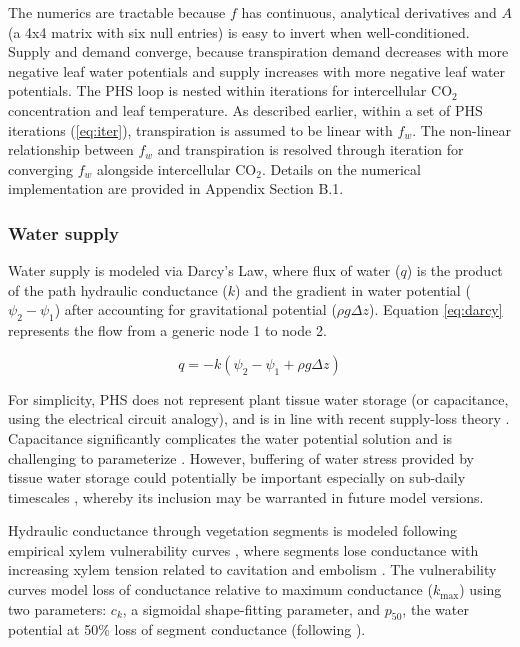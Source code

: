 \documentclass[draft,linenumbers]{agujournal}
\begin{document}
    The numerics are tractable because $f$ has continuous, analytical derivatives and $A$ (a 4x4 matrix with six null entries) is easy to invert when well-conditioned. Supply and demand converge, because transpiration demand decreases with more negative leaf water potentials and supply increases with more negative leaf water potentials. The PHS loop is nested within iterations for intercellular CO$_2$ concentration and leaf temperature. As described earlier, within a set of PHS iterations (\ref{eq:iter}), transpiration is assumed to be linear with $f_w$. The non-linear relationship between $f_w$ and transpiration is resolved through iteration for converging $f_w$ alongside intercellular CO$_2$. Details on the numerical implementation are provided in Appendix Section B.1.
   
    \subsubsection{Water supply}
    \label{sect:supply}
    Water supply is modeled via Darcy's Law, where flux of water ($q$) is the product of the path hydraulic conductance ($k$) and the gradient in water potential ($\psi_2-\psi_1$) after accounting for gravitational potential ($\rho g \Delta z$).  
    Equation \ref{eq:darcy} represents the flow from a generic node 1 to node 2. 
    
     \begin{linenomath*}
     \begin{equation}
     \label{eq:darcy}
     q = -k\left(\psi_2 - \psi_1 + \rho g \Delta z\right)
     \end{equation}
     \end{linenomath*}
    
    For simplicity, PHS does not represent plant tissue water storage (or capacitance, using the electrical circuit analogy), and is in line with recent supply-loss theory \citep{sperry2015}.  
    Capacitance significantly complicates the water potential solution \citep{celia1990} and is challenging to parameterize \citep{bartlett2016}. 
    However, buffering of water stress provided by tissue water storage could potentially be important especially on sub-daily timescales \citep{meinzer2009,epila2017}, 
    whereby its inclusion may be warranted in future model versions.

     Hydraulic conductance through vegetation segments is modeled following empirical xylem vulnerability curves \citep{tyree1989}, where segments lose conductance with increasing xylem tension related to cavitation and embolism \citep{holbrook2001}.
      The vulnerability curves model loss of conductance relative to maximum conductance ($k_{\text{max}}$) using two parameters: 
      $c_k$, a sigmoidal shape-fitting parameter, and $p_{50}$, the water potential at 50\% loss of segment conductance (following \cite{gentine2016}). 
     
\end{document}
